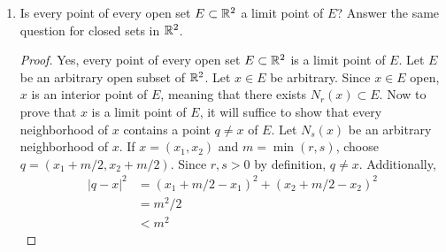 \documentclass[../psets.tex]{subfiles}
\begin{document}
\begin{enumerate}[label={\textbf{\arabic*.}}]
\begin{enumerate}
\begin{proof}
        \end{proof}
        \item If $B=\bigcup_{i=1}^\infty A_i$, prove that $\bar{B}\supset\bigcup_{i=1}^\infty\bar{A}_i$. Show, by an example, that this inclusion can be proper.
        \begin{proof}
            Let $x\in\bigcup_{i=1}^\infty\bar{A}_i$ be arbitrary. Then $x\in\bar{A}_i$ for some $i$. We divide into two cases ($x\in A_i$ and $x\in A_i'$). If $x\in A_i$, then $x\in\bigcup_{i=1}^\infty A_i=B\subset B\cup B'=\bar{B}$, as desired. On the other hand, if $x\in A_i'$, then every neighborhood of $x$ contains a point $q\neq x$ of $A_i$. But since $A_i\subset\bigcup_{i=1}^\infty A_i=B$, it follows that every neighborhood of $x$ contains a point $q\neq x$ of $B$. Thus, $x\in B'\subset B\cup B'=\bar{B}$, as desired.\par
            Define the family of sets $\{A_n\}$ by $A_n=\{1/n\}$ for each $n\in\N$. Then since each $A_n$ is finite, each $\bar{A}_n=\emptyset$, so $\bigcup_{i=1}^\infty\bar{A}_i=\emptyset$. However, $B=\bigcup_{i=1}^\infty A_i$ has zero as a limit point, so
            \begin{equation*}
                \bar{B} \supset \{0\}
                \supsetneq \emptyset
                = \bigcup_{i=1}^\infty\bar{A}_i
            \end{equation*}
            as desired.
        \end{proof}
    \end{enumerate}
    \item Is every point of every open set $E\subset\mathbb{R}^2$ a limit point of $E$? Answer the same question for closed sets in $\mathbb{R}^2$.
    \begin{proof}
        Yes, every point of every open set $E\subset\mathbb{R}^2$ is a limit point of $E$. Let $E$ be an arbitrary open subset of $\mathbb{R}^2$. Let $x\in E$ be arbitrary. Since $x\in E$ open, $x$ is an interior point of $E$, meaning that there exists $N_r(x)\subset E$. Now to prove that $x$ is a limit point of $E$, it will suffice to show that every neighborhood of $x$ contains a point $q\neq x$ of $E$. Let $N_s(x)$ be an arbitrary neighborhood of $x$. If $x=(x_1,x_2)$ and $m=\min(r,s)$, choose $q=(x_1+m/2,x_2+m/2)$. Since $r,s>0$ by definition, $q\neq x$. Additionally,
        \begin{align*}
            |q-x|^2 &= (x_1+m/2-x_1)^2+(x_2+m/2-x_2)^2\\
            &= m^2/2\\
            &< m^2
        \end{align*}

\end{proof}
\end{enumerate}
\end{document}
